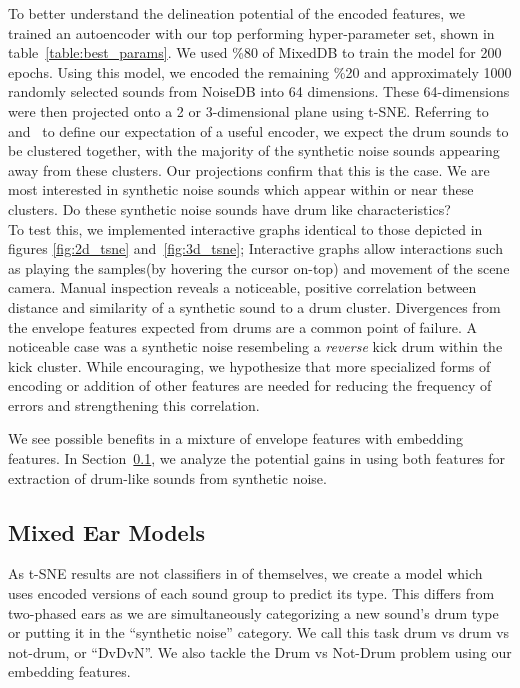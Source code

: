 \documentclass[\main/thesis.tex]{subfiles}
\begin{document}
To better understand the delineation potential of the encoded features,  we trained an autoencoder with our top performing hyper-parameter set, shown in table~\ref{table:best_params}. We used \%80 of MixedDB to train the model for 200 epochs. Using this model, we encoded the remaining \%20 and approximately 1000 randomly selected sounds from NoiseDB into 64 dimensions. These 64-dimensions were then projected onto a 2 or 3-dimensional plane using t-SNE. Referring to~ and~ to define our expectation of a useful encoder, we expect the drum sounds to be clustered together, with the majority of the synthetic noise sounds appearing away from these clusters. Our projections confirm that this is the case. We are most interested in synthetic noise sounds which appear within or near these clusters. Do these synthetic noise sounds have drum like characteristics?\\ 


To test this, we implemented interactive graphs identical to those depicted in figures \ref{fig:2d_tsne} and~\ref{fig:3d_tsne}; Interactive graphs allow interactions such as playing the samples(by hovering the cursor on-top) and movement of the scene camera.  Manual inspection reveals a noticeable, positive correlation between distance and similarity of a synthetic sound to a drum cluster. Divergences from the envelope features expected from drums are a common point of failure. A noticeable case was a synthetic noise resembeling a \emph{reverse} kick drum within the kick cluster. While encouraging, we hypothesize that more specialized forms of encoding or addition of other features are needed for reducing the frequency of errors and strengthening this correlation.

We see possible benefits in a mixture of envelope features with embedding features. In Section~\ref{chap3:mixed_ear_models}, we analyze the potential gains in using both features for extraction of drum-like sounds from synthetic noise. 

\subsection{Mixed Ear Models}
\label{chap3:mixed_ear_models}
As t-SNE results are not classifiers in of themselves, we create a model which uses encoded versions of each sound group to predict its type. This differs from two-phased ears as we are simultaneously categorizing a new sound's drum type or putting it in the \enquote{synthetic noise} category. We call this task drum vs drum vs not-drum, or \enquote{DvDvN}. We also tackle the Drum vs Not-Drum problem using our embedding features.
\end{document}
